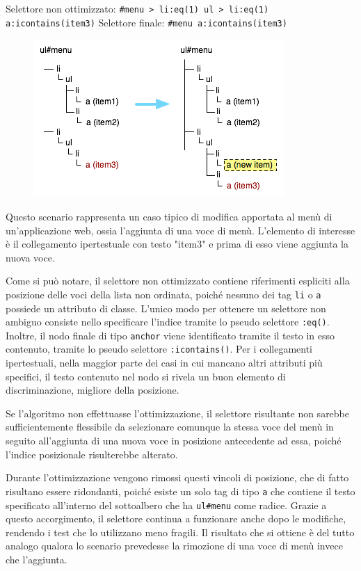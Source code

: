 Selettore non ottimizzato:  \verb|#menu > li:eq(1) ul > li:eq(1) a:icontains(item3)| 
\newline
Selettore finale:  \verb|#menu a:icontains(item3)| 

\begin{figure}[htbp]
\begin{center}
\includegraphics{images/dom_examples/menu_add_item.png}
\end{center}
\end{figure}

Questo scenario rappresenta un caso tipico di modifica apportata al menù di un'applicazione web, ossia l'aggiunta di una voce di menù. L'elemento di interesse è il collegamento ipertestuale con testo "item3" e prima di esso viene aggiunta la nuova voce. 

Come si può notare, il selettore non ottimizzato contiene riferimenti espliciti alla posizione delle voci della lista non ordinata, poiché nessuno dei tag \verb|li| o \verb|a| possiede un attributo di classe. L'unico modo per ottenere un selettore non ambiguo consiste nello specificare l'indice tramite lo pseudo selettore \verb|:eq()|. Inoltre, il nodo finale di tipo \verb|anchor| viene identificato tramite il testo in esso contenuto, tramite lo pseudo selettore \verb|:icontains()|. Per i collegamenti ipertestuali, nella maggior parte dei casi in cui mancano altri attributi più specifici, il testo contenuto nel nodo si rivela un buon elemento di discriminazione, migliore della posizione.

Se l'algoritmo non effettuasse l'ottimizzazione, il selettore risultante non sarebbe sufficientemente flessibile da selezionare comunque la stessa voce del menù in seguito all'aggiunta di una nuova voce in posizione antecedente ad essa, poiché l'indice posizionale risulterebbe alterato.

Durante l'ottimizzazione vengono rimossi questi vincoli di posizione, che di fatto risultano essere ridondanti, poiché esiste un solo tag di tipo \verb|a| che contiene il testo specificato all'interno del sottoalbero che ha \verb|ul#menu| come radice. Grazie a questo accorgimento, il selettore continua  a funzionare anche dopo le modifiche, rendendo i test che lo utilizzano meno fragili. Il risultato che si ottiene è del tutto analogo qualora lo scenario prevedesse la rimozione di una voce di menù invece che l'aggiunta.

